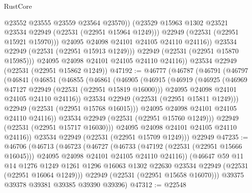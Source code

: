 \begin{lexlean}{RustCore}
\begin{coremodule}
                      @23552
                      @23555
                      @23559
                      @23564
                      @23570))
                  (@23529 @15963 @1302 @23521 @23534 @22949 (@22531 (@22951 @15964 @1249)))
                  @22949
                  (@22531 (@22951 @15921 @15970)))
                @24095
                @24098
                @24101
                @24105
                @24110
                @24116))
            @23534
            @22949
            (@22531 (@22951 @15913 @1249)))
          @22949
          (@22531 (@22951 @15870 @15985)))
        @24095
        @24098
        @24101
        @24105
        @24110
        @24116))
    @23534
    @22949
    (@22531 (@22951 @15862 @1249))
@47192 := @46777
    (@46787
      (@46791
        (@46797
          (@46841
            (@46851
              (@46855
                (@46861
                  (@46905
                    (@46915
                      (@46919
                        (@46925
                          (@46969 @47127 @22949 (@22531 (@22951 @15819 @16000)))
                          @24095
                          @24098
                          @24101
                          @24105
                          @24110
                          @24116))
                      @23534
                      @22949
                      (@22531 (@22951 @15811 @1249)))
                    @22949
                    (@22531 (@22951 @15768 @16015)))
                  @24095
                  @24098
                  @24101
                  @24105
                  @24110
                  @24116))
              @23534
              @22949
              (@22531 (@22951 @15760 @1249)))
            @22949
            (@22531 (@22951 @15717 @16030)))
          @24095
          @24098
          @24101
          @24105
          @24110
          @24116))
      @23534
      @22949
      (@22531 (@22951 @15709 @1249)))
    @22949
@47235 := @46706
    (@46713
      (@46723
        (@46727
          (@46733
            (@47192 (@22531 (@22951 @15666 @16045)))
            @24095
            @24098
            @24101
            @24105
            @24110
            @24116))
        (@46647
          @59
          @11
          @14
          @1276
          @1249
          @1261
          @1296
          @16063
          @1302
          @22630
          @23534
          @22949
          (@22531 (@22951 @16064 @1249)))
        @22949
        (@22531 (@22951 @15658 @16070)))
      @39375
      @39378
      @39381
      @39385
      @39390
      @39396)
@47312 := @22548

\end{coremodule}
\end{lexlean}
